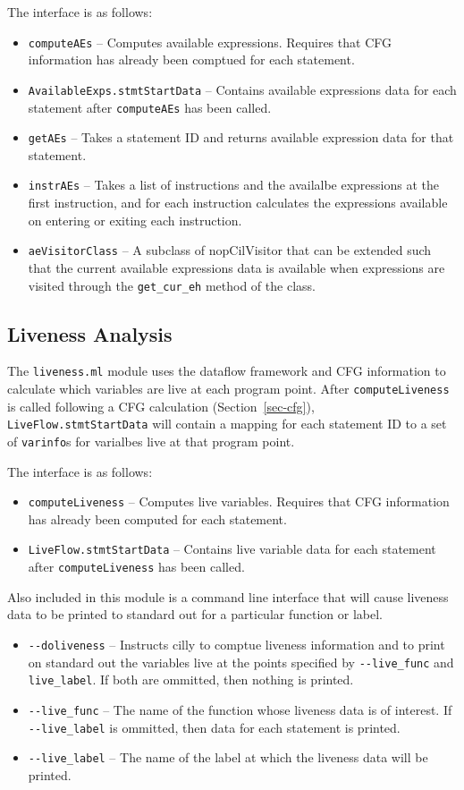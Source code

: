 \documentclass[letterpaper]{article}
\def\secref#1{Section~\ref{sec-#1}}
\def\t#1{{\tt #1}}
\begin{document}
The interface is as follows:
\begin{itemize}
\item \t{computeAEs} -- Computes available expressions. Requires
that CFG information has already been comptued for each statement.
\item \t{AvailableExps.stmtStartData} -- Contains available
expressions data for each statement after \t{computeAEs} has been
called.
\item \t{getAEs} -- Takes a statement ID and returns
available expression data for that statement.
\item \t{instrAEs} -- Takes a list of instructions and
the availalbe expressions at the first instruction, and
for each instruction calculates the expressions available
on entering or exiting each instruction.
\item \t{aeVisitorClass} -- A subclass of nopCilVisitor that
can be extended such that the current available expressions
data is available when expressions are visited through the
\t{get\_cur\_eh} method of the class.
\end{itemize}

\subsection{Liveness Analysis}

The \t{liveness.ml} module uses the dataflow framework and
CFG information to calculate which variables are live at
each program point. After \t{computeLiveness} is called
following a CFG calculation (\secref{cfg}), \t{LiveFlow.stmtStartData} will
contain a mapping for each statement ID to a set of \t{varinfo}s
for varialbes live at that program point.

The interface is as follows:
\begin{itemize}
\item \t{computeLiveness} -- Computes live variables. Requires
that CFG information has already been computed for each statement.
\item \t{LiveFlow.stmtStartData} -- Contains live variable data
for each statement after \t{computeLiveness} has been called.
\end{itemize}

Also included in this module is a command line interface that
will cause liveness data to be printed to standard out for
a particular function or label.

\begin{itemize}
\item \t{-{}-doliveness} -- Instructs cilly to comptue liveness
information and to print on standard out the variables live
at the points specified by \t{-{}-live\_func} and \t{live\_label}.
If both are ommitted, then nothing is printed.
\item \t{-{}-live\_func} -- The name of the function whose
liveness data is of interest. If \t{-{}-live\_label} is ommitted,
then data for each statement is printed.
\item \t{-{}-live\_label} -- The name of the label at which
the liveness data will be printed.
\end{itemize}
\end{document}
